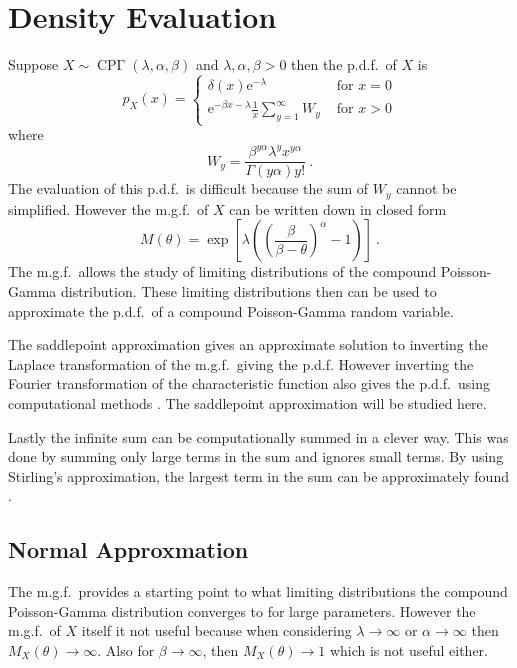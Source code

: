 \documentclass[12pt, a4paper]{memoir}
\DeclareMathOperator{\CPoisson}{CP\Gamma}
\newcommand{\euler}{\mathrm{e}}
\begin{document}
\section{Density Evaluation}
Suppose $X\sim\CPoisson(\lambda,\alpha,\beta)$ and $\lambda,\alpha,\beta>0$ then the p.d.f.~of $X$ is
\begin{equation}
	p_X(x) = 
	\begin{cases}
		\delta(x) \euler^{-\lambda} & \text{ for } x=0 \\ 
		\euler^{-\beta x-\lambda}\frac{1}{x}\sum_{y=1}^{\infty}W_y & \text{ for } x>0 
	\end{cases}
\end{equation}
where
\begin{equation}
	W_y = \frac{\beta^{y\alpha}\lambda^yx^{y\alpha}}{\Gamma(y\alpha)y!}
	\ .
	\label{eq:compoundPoisson_w}
\end{equation}
The evaluation of this p.d.f.~is difficult because the sum of $W_y$ cannot be simplified. However the m.g.f.~of $X$ can be written down in closed form
\begin{equation}
	M(\theta)=\exp\left[\lambda\left(\left(\frac{\beta}{\beta-\theta}\right)^{\alpha}-1\right)\right]
	\ .
\end{equation}
The m.g.f.~allows the study of limiting distributions of the compound Poisson-Gamma distribution. These limiting distributions then can be used to approximate the p.d.f.~of a compound Poisson-Gamma random variable.

The saddlepoint approximation \citep{daniels1954saddlepoint} gives an approximate solution to inverting the Laplace transformation  of the m.g.f.~giving the p.d.f. However inverting the Fourier transformation of the characteristic function also gives the p.d.f.~using computational methods \citep{dunn2008evaluation}. The saddlepoint approximation will be studied here.

Lastly the infinite sum can be computationally summed in a clever way. This was done by summing only large terms in the sum and ignores small terms. By using Stirling's approximation, the largest term in the sum can be approximately found \citep{dunn2005series}.

\subsection{Normal Approxmation}
The m.g.f.~provides a starting point to what limiting distributions the compound Poisson-Gamma distribution converges to for large parameters. However the m.g.f.~of $X$ itself it not useful because when considering $\lambda\rightarrow\infty$ or $\alpha\rightarrow\infty$ then $M_X(\theta)\rightarrow\infty$. Also for $\beta\rightarrow\infty$, then $M_X(\theta)\rightarrow 1$ which is not useful either.
\end{document}
